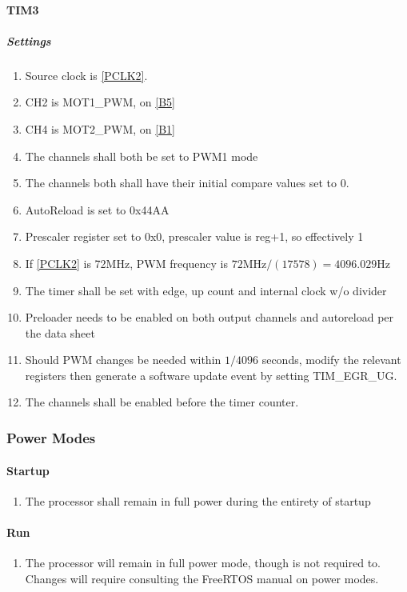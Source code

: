 \documentclass{scrreprt}
\begin{document}
	\paragraph{TIM3}
	\subparagraph{Settings}
	\begin{enumerate}
		\item Source clock is \autoref{PCLK2}.
		\item CH2 is MOT1\_PWM, on \autoref{B5} \label{TIM3CH2}
		\item CH4 is MOT2\_PWM, on \autoref{B1} \label{TIM3CH4}
		\item The channels shall both be set to PWM1 mode
		\item The channels both shall have their initial compare values set to 0.
		\item AutoReload is set to 0x44AA
		\item Prescaler register set to 0x0, prescaler value is reg+1, so effectively 1
		\item If \autoref{PCLK2} is 72MHz, PWM frequency is $72$MHz$/(17578)=4096.029$Hz
		\item The timer shall be set with edge, up count and internal clock w/o divider
		\item Preloader needs to be enabled on both output channels and autoreload per the data sheet
		\item Should PWM changes be needed within $1/4096$ seconds, modify the relevant registers then generate a software update event by setting TIM\_EGR\_UG.
		\item The channels shall be enabled before the timer counter.
	\end{enumerate}
	\subsubsection{Power Modes}
	\paragraph{Startup}
	\begin{enumerate}
		\item The processor shall remain in full power during the entirety of startup
	\end{enumerate}
	\paragraph{Run}
	\begin{enumerate}
		\item The processor will remain in full power mode, though is not required to.  Changes will require consulting the FreeRTOS manual on power modes.
	\end{enumerate}
	
\end{document}
